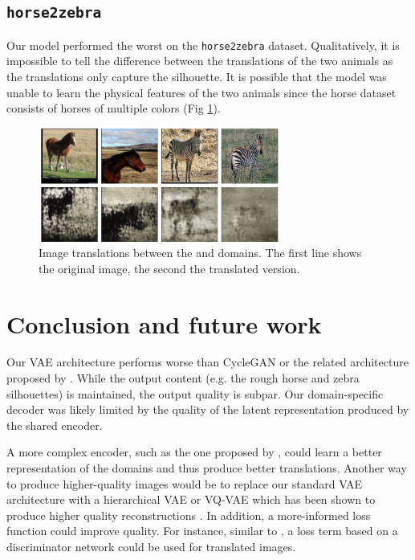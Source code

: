 \documentclass{article}
\begin{document}
\subsection{\texttt{horse2zebra}}
Our model performed the worst on the \texttt{horse2zebra} dataset. Qualitatively, it is impossible to tell the difference between the translations of the two animals as the translations only capture the silhouette. It is possible that the model was unable to learn the physical features of the two animals since the horse dataset consists of horses of multiple colors (Fig \ref{fig:horse2zebra}).
\begin{figure}[H]
  \centering
  \includegraphics[height=3.75cm]{report/assets/horse2zebra.png}
  \caption{Image translations between the  and  domains. The first line shows the original image, the second the translated version.}
  \label{fig:horse2zebra}
\end{figure}

\section{Conclusion and future work}
Our VAE architecture performs worse than CycleGAN or the related architecture proposed by \citet{liu}. While the output content (e.g. the rough horse and zebra silhouettes) is maintained, the output quality is subpar. Our domain-specific decoder was likely limited by the quality of the latent representation produced by the shared encoder.

A more complex encoder, such as the one proposed by \citet{liu}, could learn a better representation of the domains and thus produce better translations. Another way to produce higher-quality images would be to replace our standard VAE architecture with a hierarchical VAE or VQ-VAE which has been shown to produce higher quality reconstructions \citep{vahdat}. In addition, a more-informed loss function could improve quality. For instance, similar to \citet{liu}, a loss term based on a discriminator network could be used for translated images.

\newpage

\end{document}
